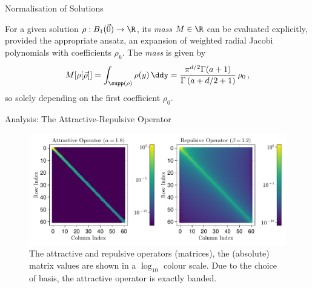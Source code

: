 \documentclass[aspectratio=169, hyperref={colorlinks=true}]{beamer}
\begin{document}
  \begin{frame}{Normalisation of Solutions}
    \begin{lemma}
      For a given solution $\rho: B_1(\vec{0}) \to \R$, its \textit{mass} $M \in \R$ can be evaluated explicitly, provided the appropriate ansatz, an expansion of weighted radial Jacobi polynomials with coefficients $\rho_k$. The \textit{mass} is given by
      \begin{align*}
        M[\rho[\vec{\rho}]] = \int_{\supp(\rho)} \rho(y) \,\ddy = \frac{\pi^{{d/2}}\Gamma (a+1)}{\Gamma \left(a+{d/2}+1\right)}\, \rho_0\,,
      \end{align*}
      so solely depending on the first coefficient $\rho_0$.
    \end{lemma}
  \end{frame}

  \begin{frame}{Analysis: The Attractive-Repulsive Operator}
    \begin{figure}[H]
      \centering
      \includegraphics[width=0.9\linewidth]{results/attrep/attractive-repulsive-operators.pdf}
      \caption[Attractive and repulsive operators.]{The attractive and repulsive operators (matrices), the (absolute) matrix values are shown in a $\log_{10}$ colour scale. Due to the choice of basis, the attractive operator is exactly banded.}
      \label{fig:attractive-repulsive}
    \end{figure}
  \end{frame}
\end{document}
